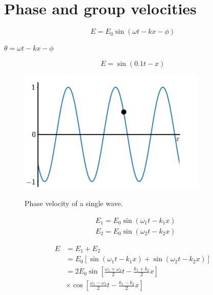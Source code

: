 \section{Phase and group velocities}

\begin{equation}
E=E_{0} \sin (\omega t-k x-\phi)
\end{equation}


$\theta=\omega t-k x-\phi$

\begin{equation}
E=\sin (0.1 t-x)
\end{equation}

\begin{figure}[H]
   \centering
    \includegraphics[width=0.8\textwidth]{lesson6/black_dot.pdf}
    \label{fig: 1}
    
        \caption{Phase velocity of a single wave.}
    
\end{figure}

\begin{equation}
\begin{aligned}
&E_{1}=E_{0} \sin \left(\omega_{1} t-k_{1} x\right) \\
&E_{2}=E_{0} \sin \left(\omega_{2} t-k_{2} x\right)
\end{aligned}
\end{equation}

\begin{equation}
\begin{aligned}
E &=E_{1}+E_{2} \\
&=E_{0}\left[\sin \left(\omega_{1} t-k_{1} x\right)+\sin \left(\omega_{2} t-k_{2} x\right)\right] \\
&=2 E_{0} \sin \left[\frac{\omega_{1}+\omega_{2}}{2} t-\frac{k_{1}+k_{2}}{2} x\right] \\
& \times \cos \left[\frac{\omega_{1}-\omega_{2}}{2} t-\frac{k_{1}-k_{2}}{2} x\right]
\end{aligned}
\end{equation}

